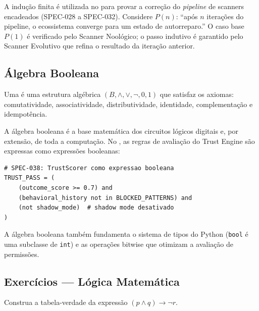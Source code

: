 \begin{exemplo}
    A indução finita é utilizada no \opencodeeco{} para provar a correção do
    \textit{pipeline} de scanners encadeados (SPEC-028 a SPEC-032).
    Considere $P(n)$: ``após $n$ iterações do pipeline, o ecossistema
    converge para um estado de autorreparo.''
    O caso base $P(1)$ é verificado pelo Scanner Noológico; o passo indutivo
    é garantido pelo Scanner Evolutivo que refina o resultado da iteração
    anterior.
\end{exemplo}

\subsection{Álgebra Booleana}

\begin{definicao}
    Uma  é uma estrutura algébrica
    $(B, \land, \lor, \neg, 0, 1)$ que satisfaz os axiomas: comutatividade,
    associatividade, distributividade, identidade, complementação e
    idempotência.
\end{definicao}

A álgebra booleana é a base matemática dos circuitos lógicos digitais e,
por extensão, de toda a computação. No \opencodeeco{}, as regras de
avaliação do Trust Engine são expressas como expressões booleanas:

\begin{lstlisting}[style=pythonstyle]
# SPEC-038: TrustScorer como expressao booleana
TRUST_PASS = (
    (outcome_score >= 0.7) and
    (behavioral_history not in BLOCKED_PATTERNS) and
    (not shadow_mode)  # shadow mode desativado
)
\end{lstlisting}

\begin{observacao}
    A álgebra booleana também fundamenta o sistema de tipos do Python
    (\lstinline{bool} é uma subclasse de \lstinline{int}) e as operações
    bitwise que otimizam a avaliação de permissões.
\end{observacao}

\subsection{Exercícios — Lógica Matemática}

\begin{exercicio}[Nivel 0]
    Construa a tabela-verdade da expressão $(p \land q) \to \neg r$.
\end{exercicio}

